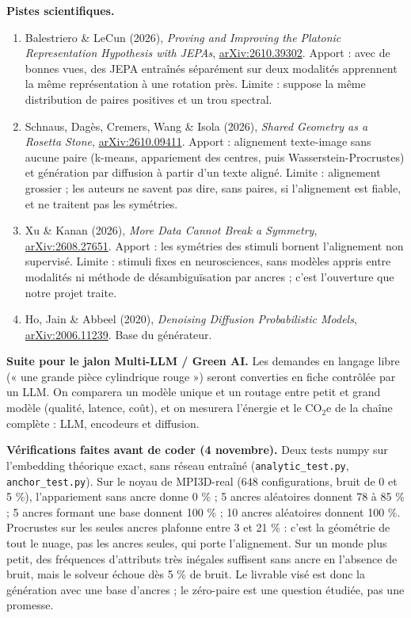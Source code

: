 \documentclass[10pt,a4paper]{article}
\begin{document}
\textbf{Pistes scientifiques.}
\begin{enumerate}
\item Balestriero \& LeCun (2026), \emph{Proving and Improving the Platonic Representation Hypothesis with JEPAs}, \href{https://arxiv.org/abs/2610.39302}{arXiv:2610.39302}. Apport : avec de bonnes vues, des JEPA entraînés séparément sur deux modalités apprennent la même représentation à une rotation près. Limite : suppose la même distribution de paires positives et un trou spectral.
\item Schnaus, Dagès, Cremers, Wang \& Isola (2026), \emph{Shared Geometry as a Rosetta Stone}, \href{https://arxiv.org/abs/2610.09411}{arXiv:2610.09411}. Apport : alignement texte-image sans aucune paire (k-means, appariement des centres, puis Wasserstein-Procrustes) et génération par diffusion à partir d'un texte aligné. Limite : alignement grossier ; les auteurs ne savent pas dire, sans paires, si l'alignement est fiable, et ne traitent pas les symétries.
\item Xu \& Kanan (2026), \emph{More Data Cannot Break a Symmetry}, \href{https://arxiv.org/abs/2608.27651}{arXiv:2608.27651}. Apport : les symétries des stimuli bornent l'alignement non supervisé. Limite : stimuli fixes en neurosciences, sans modèles appris entre modalités ni méthode de désambiguïsation par ancres ; c'est l'ouverture que notre projet traite.
\item Ho, Jain \& Abbeel (2020), \emph{Denoising Diffusion Probabilistic Models}, \href{https://arxiv.org/abs/2006.11239}{arXiv:2006.11239}. Base du générateur.
\end{enumerate}

\textbf{Suite pour le jalon Multi-LLM / Green AI.} Les demandes en langage libre (« une grande pièce cylindrique rouge ») seront converties en fiche contrôlée par un LLM. On comparera un modèle unique et un routage entre petit et grand modèle (qualité, latence, coût), et on mesurera l'énergie et le CO$_2$e de la chaîne complète : LLM, encodeurs et diffusion.

\textbf{Vérifications faites avant de coder (4 novembre).} Deux tests numpy sur l'embedding théorique exact, sans réseau entraîné (\texttt{analytic\_test.py}, \texttt{anchor\_test.py}). Sur le noyau de MPI3D-real (648 configurations, bruit de 0 et 5 \%), l'appariement sans ancre donne 0 \% ; 5 ancres aléatoires donnent 78 à 85 \% ; 5 ancres formant une base donnent 100 \% ; 10 ancres aléatoires donnent 100 \%. Procrustes sur les seules ancres plafonne entre 3 et 21 \% : c'est la géométrie de tout le nuage, pas les ancres seules, qui porte l'alignement. Sur un monde plus petit, des fréquences d'attributs très inégales suffisent sans ancre en l'absence de bruit, mais le solveur échoue dès 5 \% de bruit. Le livrable visé est donc la génération avec une base d'ancres ; le zéro-paire est une question étudiée, pas une promesse.
\end{document}
